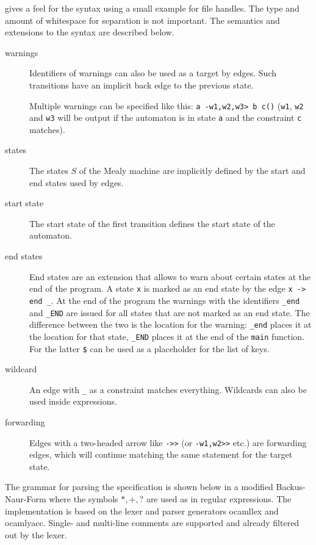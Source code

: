  gives a feel for the syntax using a small example for file handles. The type and amount of whitespace for separation is not important.
The semantics and extensions to the syntax are described below.
\begin{description}
\item[warnings]
Identifiers of warnings can also be used as a target by edges. Such transitions have an implicit back edge to the previous state.

Multiple warnings can be specified like this: \verb|a -w1,w2,w3> b c()| (\verb|w1|, \verb|w2| and \verb|w3| will be output if the automaton is in state \verb|a| and the constraint \verb|c| matches).

\item[states]
The states $S$ of the Mealy machine are implicitly defined by the start and end states used by edges.

\item[start state]
The start state of the first transition defines the start state of the automaton.

\item[end states]
End states are an extension that allows to warn about certain states at the end of the program. A state \verb|x| is marked as an end state by the edge \verb|x -> end _|.
At the end of the program the warnings with the identifiers \verb|_end| and \verb|_END| are issued for all states that are not marked as an end state. The difference between the two is the location for the warning: \verb|_end| places it at the location for that state, \verb|_END| places it at the end of the \verb|main| function. For the latter \verb|$| can be used as a placeholder for the list of keys.

\item[wildcard]
An edge with \verb|_| as a constraint matches everything. Wildcards can also be used inside expressions.

\item[forwarding]
Edges with a two-headed arrow like \verb|->>| (or \verb|-w1,w2>>| etc.) are forwarding edges, which will continue matching the same statement for the target state.
\end{description}
The grammar for parsing the specification is shown below in a modified Backus-Naur-Form where the symbols $*, +, ?$ are used as in regular expressions. The implementation is based on the lexer and parser generators ocamllex and ocamlyacc. Single- and multi-line comments are supported and already filtered out by the lexer.

